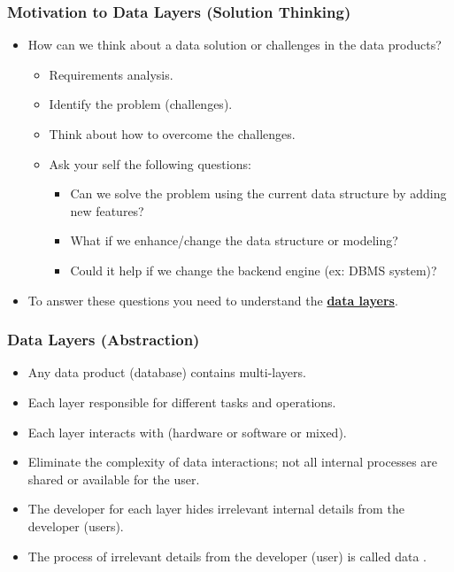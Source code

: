 \begin{frame}
	\frametitle{Motivation to Data Layers (Solution Thinking)}
	
	\begin{itemize}[<+->]
		\item How can we think about a data solution or challenges in the data products?
		\begin{itemize}[<+->]
			\item Requirements analysis.
			\item Identify the problem (challenges).
			\item Think about how to overcome the challenges.
			\item Ask your self the following questions:
			\begin{itemize}[<+->]
				\item Can we solve the problem using the current data structure by adding new features?
				\item What if we enhance/change the data structure or modeling?
				\item Could it help if we change the backend engine (ex: DBMS system)?
			\end{itemize}			
		\end{itemize}
		\item To answer these questions you need to understand the \textbf{\underline{data layers}}.
	\end{itemize}
	
\end{frame}
\begin{frame}
	\frametitle{Data Layers (Abstraction)}
	\begin{itemize}[<+->]
		\item Any data product (database) contains multi-layers.
		\item Each layer responsible for different tasks and operations.
		\item Each layer interacts with (hardware or software or mixed).
		\item Eliminate the complexity of data interactions; not all internal processes are shared or available for the user.
		\item The developer for each layer hides irrelevant internal details from the developer (users). 
		\item The process of \textbf{\underline{}} irrelevant details from the developer (user) is called data \textbf{\underline{}}.
	\end{itemize}	
\end{frame}

